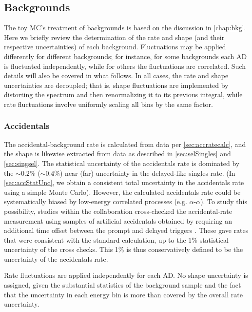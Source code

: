\documentclass[../thesis.tex]{subfiles}
\begin{document}
\subsection{Backgrounds}
\label{sec:fitToyBackgrounds}

The toy MC's treatment of backgrounds is based on the discussion in \autoref{chap:bkg}. Here we briefly review the determination of the rate and shape (and their respective uncertainties) of each background. Fluctuations may be applied differently for different backgrounds; for instance, for some backgrounds each AD is fluctuated independently, while for others the fluctuations are correlated. Such details will also be covered in what follows. In all cases, the rate and shape uncertainties are decoupled; that is, shape fluctuations are implemented by distorting the spectrum and then renormalizing it to its previous integral, while rate fluctuations involve uniformly scaling all bins by the same factor.

\subsubsection{Accidentals}

The accidental-background rate is calculated from data per \autoref{sec:accratecalc}, and the shape is likewise extracted from data as described in \autoref{sec:selSingles} and \autoref{sec:singsel}. The statistical uncertainty of the accidentals rate is dominated by the $\sim$0.2\% ($\sim$0.4\%) near (far) uncertainty in the delayed-like singles rate. (In \autoref{sec:accStatUnc}, we obtain a consistent total uncertainty in the accidentals rate using a simple Monte Carlo). However, the calculated accidentals rate could be systematically biased by low-energy correlated processes (e.g. $\alpha$-$\alpha$). To study this possibility, studies within the collaboration cross-checked the accidental-rate measurement using samples of artificial accidentals obtained by requiring an additional time offset between the prompt and delayed triggers \cite{An_2017}. These gave rates that were consistent with the standard calculation, up to the 1\% statistical uncertainty of the cross checks. This 1\% is thus conservatively defined to be the uncertainty of the accidentals rate.

Rate fluctuations are applied independently for each AD. No shape uncertainty is assigned, given the substantial statistics of the background sample and the fact that the uncertainty in each energy bin is more than covered by the overall rate uncertainty.
\end{document}
